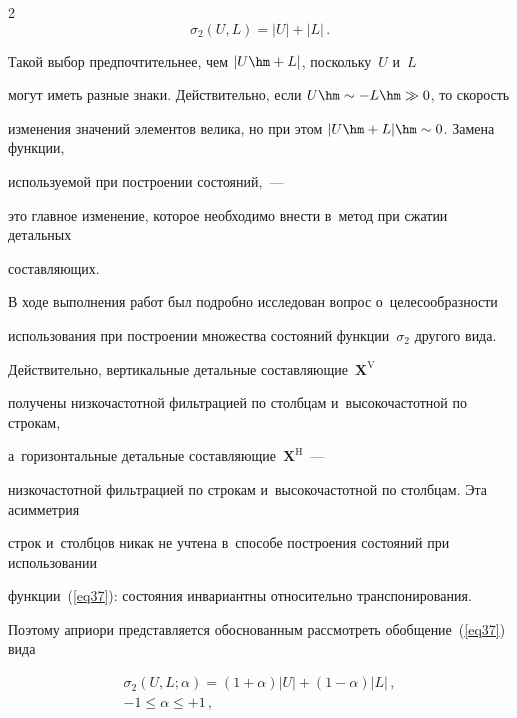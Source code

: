 \begin{multicols}{2}
\begin{equation}
\sigma_2(U,L) = |U|+|L|\,.

\end{equation}

Такой выбор предпочтительнее, чем $|U\hm+L|$, поскольку~$U$ и~$L$ 

могут иметь разные знаки. Действительно, если  $U\hm\sim -L \hm\gg 0$, то скорость 

изменения значений элементов велика, но при этом $|U\hm+L|\hm\sim 0$. Замена функции, 

используемой при по\-стро\-ении состояний,~--- 

это главное изменение, которое необходимо внести в~метод при сжатии детальных 

составляющих.



В ходе выполнения работ был подробно исследован вопрос о~целесообразности 

использования при построении множества со\-сто\-яний функции~$\sigma_2$ другого вида. 

Действительно, вертикальные детальные со\-став\-ля\-ющие~$\mathbf{X}^{\mathrm{V}}$ 

получены низкочастотной фильтрацией по столбцам и~высокочастотной по строкам, 

а~горизонтальные детальные со\-став\-ля\-ющие~$\mathbf{X}^{\mathrm{H}}$~--- 

низкочастотной фильтрацией по строкам и~высокочастотной по столбцам. Эта асим\-мет\-рия 

строк и~столбцов никак не учтена в~способе построения состояний при использовании 

функции~(\ref{eq37}): состояния инвариантны относительно транспонирования. 

Поэтому априори представляется обоснованным рассмотреть обобщение~(\ref{eq37}) \mbox{вида}



\vspace*{-3pt}



\noindent

\begin{multline}

\label{eq38}

\sigma_2(U,L;\alpha) = (1+\alpha)|U| + (1-\alpha)|L|\,,\\

-1\leq\alpha\leq +1\,,

\end{multline}




\end{multicols}
